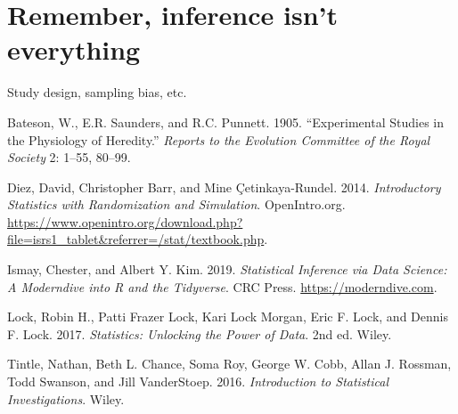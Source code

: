 \documentclass[]{tufte-book}
\begin{document}
\hypertarget{remember-inference-isnt-everything}{%
\chapter{Remember, inference isn't everything}\label{remember-inference-isnt-everything}}

Study design, sampling bias, etc.

\hypertarget{refs}{}
\leavevmode\hypertarget{ref-punnett-1905}{}%
Bateson, W., E.R. Saunders, and R.C. Punnett. 1905. ``Experimental Studies in the Physiology of Heredity.'' \emph{Reports to the Evolution Committee of the Royal Society} 2: 1--55, 80--99.

\leavevmode\hypertarget{ref-ISRS}{}%
Diez, David, Christopher Barr, and Mine Çetinkaya-Rundel. 2014. \emph{Introductory Statistics with Randomization and Simulation}. OpenIntro.org. \url{https://www.openintro.org/download.php?file=isrs1_tablet\&referrer=/stat/textbook.php}.

\leavevmode\hypertarget{ref-modern-dive}{}%
Ismay, Chester, and Albert Y. Kim. 2019. \emph{Statistical Inference via Data Science: A Moderndive into R and the Tidyverse}. CRC Press. \url{https://moderndive.com}.

\leavevmode\hypertarget{ref-lock5}{}%
Lock, Robin H., Patti Frazer Lock, Kari Lock Morgan, Eric F. Lock, and Dennis F. Lock. 2017. \emph{Statistics: Unlocking the Power of Data}. 2nd ed. Wiley.

\leavevmode\hypertarget{ref-tintle-investigations}{}%
Tintle, Nathan, Beth L. Chance, Soma Roy, George W. Cobb, Allan J. Rossman, Todd Swanson, and Jill VanderStoep. 2016. \emph{Introduction to Statistical Investigations}. Wiley.
\end{document}

